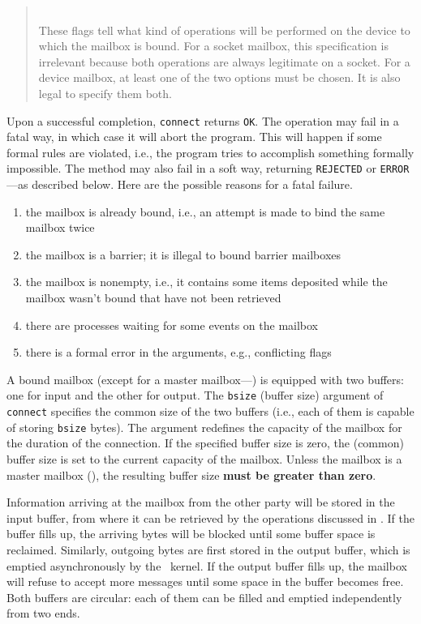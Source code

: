 \begin{quote}
\noindent{}\\ \hspace{0in}
These flags tell what kind of operations will be performed on the
device to which the mailbox is bound.
For a socket mailbox, this specification is irrelevant because both
operations are always legitimate on a socket.
For a device mailbox, at least one of the two options must be chosen.
It is also legal to specify them both.
\end{quote}

Upon a successful completion, {\tt connect} returns {\tt OK}.
The operation may fail in a fatal way, in which case it will abort the program.
This will happen if some formal rules are violated, i.e., the program tries
to accomplish something formally impossible.
The method may also fail in a soft way, returning {\tt REJECTED} or
{\tt ERROR}---as described below.
Here are the possible reasons for a fatal failure.

\begin{enumerate}
\item
the mailbox is already bound, i.e., an attempt is made
to bind the same mailbox twice
\item
the mailbox is a barrier; it is illegal to bound barrier mailboxes
\item
the mailbox is nonempty, i.e., it contains some items deposited
while the mailbox wasn't bound that have not been retrieved
\item
there are processes waiting for some events on the mailbox
\item
there is a formal error in the arguments, e.g., conflicting flags
\end{enumerate}

A bound mailbox (except for a master mailbox---)
is equipped with two buffers: one for input and the other for output.
The {\tt bsize} (buffer size) argument of {\tt connect} specifies the
common size of the two buffers (i.e., each of them is capable of storing
{\tt bsize} bytes).
The argument redefines the capacity of the mailbox for the duration
of the connection.
If the specified buffer size is zero, the (common) buffer size is set to the
current capacity of the mailbox.
Unless the mailbox is a master mailbox (),
the resulting buffer size {\bf must be greater than zero}.

Information arriving at the mailbox from the other party will be stored
in the input buffer, from where it can be retrieved by the operations
discussed in .
If the buffer fills up, the arriving bytes will be blocked until some
buffer space is reclaimed.
Similarly, outgoing bytes are first stored in the output buffer, which is
emptied asynchronously by the \smurph\ kernel.
If the output buffer fills up, the mailbox will refuse to accept more
messages until some space in the buffer becomes free.
Both buffers are circular: each of them
can be filled and emptied independently from two ends.

